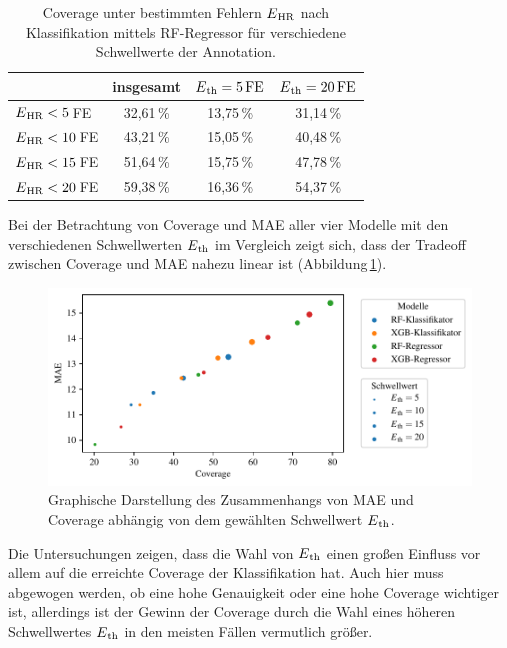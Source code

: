\begin{table}[H]
	\centering
  	\begin{tabular}{l || c | c | c}
 											& insgesamt 		& $E\textsubscript{th}= 5\text{\,}\si{FE}$ & $E\textsubscript{th}= 20\text{\,}\si{FE}$\\\hline
 		$E\textsubscript{HR} < 5$\,\si{FE} 	&  32{,}61\,\% 	& 13,75\,\% 			& 31,14\,\%\\
 		$E\textsubscript{HR} < 10$\,\si{FE} 	&  43{,}21\,\% 	& 15,05\,\% 			& 40,48\,\%\\
 		$E\textsubscript{HR} < 15$\,\si{FE} 	&  51{,}64\,\% 	& 15,75\,\% 			& 47,78\,\%\\
 		$E\textsubscript{HR} < 20$\,\si{FE} 	&  59{,}38\,\% 	& 16,36\,\% 			& 54,37\,\%\\
 	\end{tabular}
 	\caption{Coverage unter bestimmten Fehlern $E\textsubscript{HR}$ nach Klassifikation mittels \ac{RF}-Regressor für verschiedene Schwellwerte der Annotation.}
 	\label{fig:rf-regr-cov-eth}
\end{table}


Bei der Betrachtung von Coverage und \ac{MAE} aller vier Modelle mit den verschiedenen Schwellwerten $E\textsubscript{th}$ im Vergleich zeigt sich, dass der Tradeoff zwischen Coverage und \ac{MAE} nahezu linear ist (Abbildung\,\ref{fig:threshold-variation}). %

\begin{figure}[H]
	\centering
	\includegraphics[scale=0.95]{pic/threshold-variation.pdf}
 	\caption{Graphische Darstellung des Zusammenhangs von \ac{MAE} und Coverage abhängig von dem gewählten Schwellwert $E\textsubscript{th}$.}
 	\label{fig:threshold-variation}
\end{figure}

Die Untersuchungen zeigen, dass die Wahl von $E\textsubscript{th}$ einen großen Einfluss vor allem auf die erreichte Coverage der Klassifikation hat. Auch hier muss abgewogen werden, ob eine hohe Genauigkeit oder eine hohe Coverage wichtiger ist, allerdings ist der Gewinn der Coverage durch die Wahl eines höheren Schwellwertes $E\textsubscript{th}$ in den meisten Fällen vermutlich größer.

